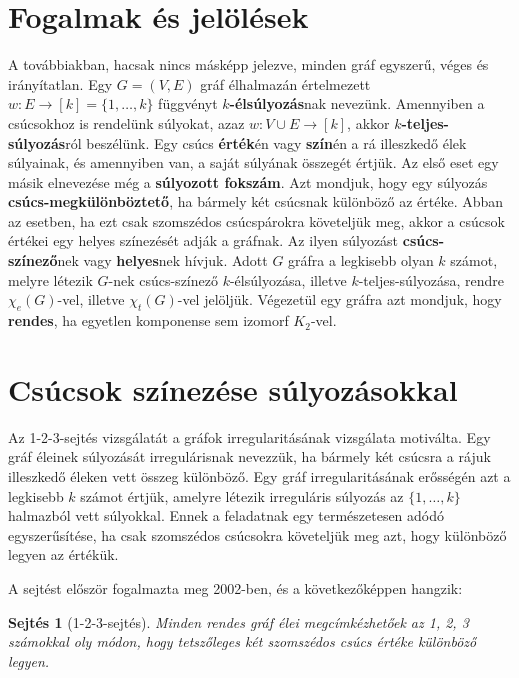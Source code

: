\documentclass[12pt, a4paper]{report}
\newtheorem{sej}[tét]{Sejtés}
\theoremstyle{remark}
\theoremstyle{definition}
\begin{document}
\section{Fogalmak és jelölések}
A továbbiakban, hacsak nincs másképp jelezve, minden gráf egyszerű, véges és irányítatlan. Egy $G = (V, E)$ gráf élhalmazán értelmezett $w: E \rightarrow [k] = \lbrace 1, \ldots, k \rbrace$ függvényt \textbf{$k$-élsúlyozás}nak nevezünk. Amennyiben a csúcsokhoz is rendelünk súlyokat, azaz $w: V \cup E \rightarrow [k]$, akkor \textbf{$k$-teljes-súlyozás}ról beszélünk. Egy csúcs \textbf{érték}én vagy \textbf{szín}én a rá illeszkedő élek súlyainak, és amennyiben van, a saját súlyának összegét értjük. Az első eset egy másik elnevezése még a \textbf{súlyozott fokszám}. Azt mondjuk, hogy egy súlyozás \textbf{csúcs-megkülönböztető}, ha bármely két csúcsnak különböző az értéke. Abban az esetben, ha ezt csak szomszédos csúcspárokra követeljük meg, akkor a csúcsok értékei egy helyes színezését adják a gráfnak. Az ilyen súlyozást \textbf{csúcs-színező}nek vagy \textbf{helyes}nek hívjuk. Adott $G$ gráfra a legkisebb olyan $k$ számot, melyre létezik $G$-nek csúcs-színező $k$-élsúlyozása, illetve $k$-teljes-súlyozása, rendre $\chi_e(G)$-vel, illetve $\chi_t(G)$-vel jelöljük. Végezetül egy gráfra azt mondjuk, hogy \textbf{rendes}, ha egyetlen komponense sem izomorf $K_2$-vel.

\section{Csúcsok színezése súlyozásokkal}
Az 1-2-3-sejtés vizsgálatát a gráfok irregularitásának vizsgálata motiválta. Egy gráf éleinek súlyozását irregulárisnak nevezzük, ha bármely két csúcsra a rájuk illeszkedő éleken vett összeg különböző. Egy gráf irregularitásának erősségén azt a legkisebb $k$ számot értjük, amelyre létezik irreguláris súlyozás az $\lbrace 1, \ldots, k \rbrace$ halmazból vett súlyokkal. Ennek a feladatnak egy természetesen adódó egyszerűsítése, ha csak szomszédos csúcsokra követeljük meg azt, hogy különböző legyen az értékük. 

A sejtést először \citeauthor{Karonski2004} \cite{Karonski2004} fogalmazta meg 2002-ben, és a következőképpen hangzik: 

\begin{sej}[1-2-3-sejtés]
Minden rendes gráf élei megcímkézhetőek az 1, 2, 3 számokkal oly módon, hogy tetszőleges két szomszédos csúcs értéke különböző legyen.
\end{sej}
\end{document}
